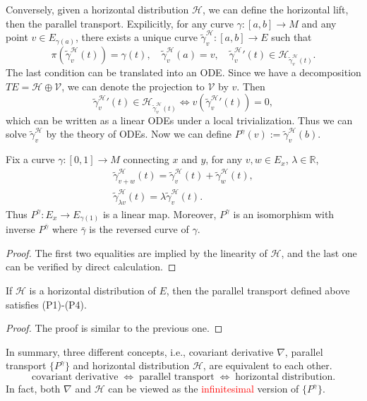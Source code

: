 Conversely, given a horizontal distribution $\mathcal{H}$, we can define the horizontal lift, then the parallel transport. 
Expilicitly, for any curve $\gamma: [a,b] \to M$ and any point $v\in E_{\gamma(a)}$, 
there exists a unique curve $\tilde{\gamma}^{\mathcal{H}}_v: [a,b] \to E$ such that 
\begin{equation*}
    \pi(\tilde{\gamma}^{\mathcal{H}}_v(t)) = \gamma(t), \quad \tilde{\gamma}^{\mathcal{H}}_v(a) = v, \quad \tilde{\gamma}^{\mathcal{H}}_v{}'(t) \in \mathcal{H}_{\tilde{\gamma}^{\mathcal{H}}_v(t)}.
\end{equation*}
The last condition can be translated into an ODE. Since we have a decomposition $TE = \mathcal{H} \oplus \mathcal{V}$, 
we can denote the projection to $\mathcal{V}$ by $v$. Then 
\begin{equation*}
    \tilde{\gamma}^{\mathcal{H}}_v{}'(t) \in \mathcal{H}_{\tilde{\gamma}^{\mathcal{H}}_v(t)} \iff v(\tilde{\gamma}^{\mathcal{H}}_v{}'(t)) = 0,
\end{equation*}
which can be written as a linear ODEs under a local trivialization. Thus we can solve $\tilde{\gamma}^{\mathcal{H}}_v$ by the theory of ODEs. 
Now we can define $P^\gamma(v) := \tilde{\gamma}^{\mathcal{H}}_v(b)$. 
\begin{proposition}
    Fix a curve $\gamma:[0,1]\to M$ connecting $x$ and $y$, for any $v,w\in E_x$, $\lambda\in \mathbb{R}$, 
    \begin{gather*}
        \tilde{\gamma}^{\mathcal{H}}_{v+w}(t) = \tilde{\gamma}^{\mathcal{H}}_v(t) + \tilde{\gamma}^{\mathcal{H}}_w(t), \\
        \tilde{\gamma}^{\mathcal{H}}_{\lambda v}(t) = \lambda \tilde{\gamma}^{\mathcal{H}}_v(t).
    \end{gather*}
    Thus $P^\gamma: E_x \to E_{\gamma(1)}$ is a linear map. Moreover, $P^\gamma$ is an isomorphism with inverse $P^{\bar{\gamma}}$ 
    where $\bar{\gamma}$ is the reversed curve of $\gamma$.
\end{proposition}
\begin{proof}
    The first two equalities are implied by the linearity of $\mathcal{H}$, and the last one can be verified by direct calculation.
\end{proof}
\begin{theorem}
    If $\mathcal{H}$ is a horizontal distribution of $E$, then the parallel transport defined above satisfies (P1)-(P4).
\end{theorem}
\begin{proof}
    The proof is similar to the previous one.
\end{proof}
In summary, three different concepts, i.e., covariant derivative $\nabla$, parallel transport $\{P^\gamma\}$ 
and horizontal distribution $\mathcal{H}$, are equivalent to each other.
\begin{equation*}
    \text{covariant derivative} \;\Longleftrightarrow\; \text{parallel transport} \;\Longleftrightarrow\; \text{horizontal distribution}.
\end{equation*}
In fact, both $\nabla$ and $\mathcal{H}$ can be viewed as the \textcolor{red}{infinitesimal} version of $\{P^\gamma\}$.

